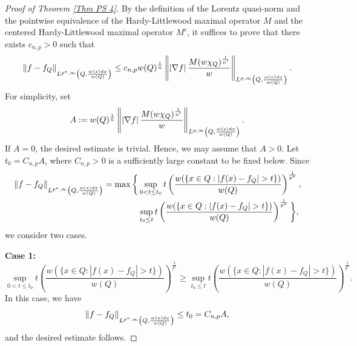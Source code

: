\documentclass[10pt,a4paper]{amsart}
\newcommand{\strt}[1]{\rule{0pt}{#1}}
\begin{document}
\begin{proof}[Proof of Theorem \ref{Thm PS 4}]
By the definition of the Lorentz quasi-norm and the pointwise equivalence of the Hardy-Littlewood maximal operator $M$ and the centered Hardy-Littlewood maximal operator $M^c$, it suffices to prove that there exists $c_{n,p}>0$ such that 
%
\begin{equation}\label{Thm PS 4 normalized Eq}
    \left\| f-f_Q\right\|_{\strt{2.3ex} L^{p^*,\infty}\left(Q,\frac{w(x)dx}{w(Q)}\right)} \le c_{n,p} w(Q)^\frac{1}{n} \left\| \left| \nabla f \right| \frac{M(w\chi_Q)^\frac{1}{n'}}{w} \right\|_{\strt{2.3ex} L^{p,\infty}\left(Q,\frac{w(x)dx}{w(Q)}\right)}.
\end{equation}
For simplicity, set
\begin{equation*}
    A:=w(Q)^\frac{1}{n} \left\| \left| \nabla f \right| \frac{M(w\chi_Q)^\frac{1}{n'}}{w} \right\|_{\strt{2.3ex}L^{p,\infty}\left(Q,\frac{w(x)dx}{w(Q)}\right)}.
\end{equation*}
If $A=0$, the desired estimate is trivial. Hence, we may assume that $A>0$. Let $t_0= C_{n,p}A$, where $C_{n,p}>0$ is a sufficiently large constant to be fixed below. Since
\begin{align*}
    \left\| f-f_Q\right\|_{\strt{2.3ex}L^{p^*,\infty}\left(Q,\frac{w(x)dx}{w(Q)}\right)} = \max \bigg\{& \sup_{0<t\le t_0} t \left(\frac{w(\{x\in Q:|f(x)-f_Q|>t\})}{w(Q)}\right)^\frac{1}{p^*}, \\
    & \sup_{t_0\le t} t \left(\frac{w(\{x\in Q:|f(x)-f_Q|>t\})}{w(Q)}\right)^\frac{1}{p^*} \bigg\},
\end{align*}
we consider two cases.

\textbf{Case 1:}
\begin{equation*}
    \sup_{0<t\le t_0} t \left(\frac{w(\{x\in Q:|f(x)-f_Q|>t\})}{w(Q)}\right)^\frac{1}{p^*} \ge \sup_{t_0\le t} t \left(\frac{w(\{x\in Q:|f(x)-f_Q|>t\})}{w(Q)}\right)^\frac{1}{p^*}.
\end{equation*}
In this case, we have
\begin{equation*}
    \left\| f-f_Q\right\|_{\strt{2.3ex} L^{p^*,\infty}\left(Q,\frac{w(x)dx}{w(Q)}\right)} \le t_0=C_{n,p}A,
\end{equation*}
and the desired estimate follows.


\end{proof}
\end{document}
